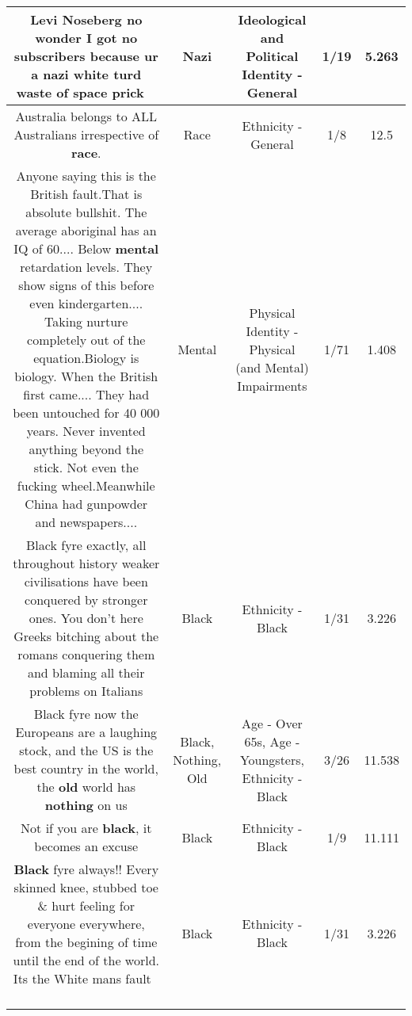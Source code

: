 \documentclass[11pt]{article}
\newlength\mylength
\begin{document}
\begin{center}
\begin{longtable}{|C{.65\mylength}|C{.30\mylength}|C{.12\mylength}|C{.12\mylength}|C{.12\mylength}|}
  \small Levi Noseberg no wonder I got no subscribers because ur a \textbf{nazi} white turd waste of space prick 🖕🏾\normalsize   & Nazi &  Ideological and Political Identity - General & 1/19 & 5.263 \\  \hline
  \small Australia belongs to ALL Australians irrespective of \textbf{race}.\normalsize   & Race & Ethnicity - General & 1/8 & 12.5 \\  \hline
  \small Anyone saying this is the British fault.That is absolute bullshit. The average aboriginal has an IQ of 60.... Below \textbf{mental} retardation levels. They show signs of this before even kindergarten.... Taking nurture completely out of the equation.Biology is biology. When the British first came.... They had been untouched for 40 000 years. Never invented anything beyond the stick. Not even the fucking wheel.Meanwhile China had gunpowder and newspapers....\normalsize   & Mental & Physical Identity - Physical (and Mental) Impairments & 1/71 & 1.408 \\  \hline
  \small Black fyre exactly, all throughout history weaker civilisations have been conquered by stronger ones. You don't here Greeks bitching about the romans conquering them and blaming all their problems on Italians\normalsize   & Black & Ethnicity - Black & 1/31 & 3.226 \\  \hline
  \small Black fyre now the Europeans are a laughing stock, and the US is the best country in the world, the \textbf{old} world has \textbf{nothing} on us\normalsize   & Black, Nothing, Old & Age - Over 65s, Age - Youngsters, Ethnicity - Black & 3/26 & 11.538 \\  \hline
  \small Not if you are \textbf{black},  it becomes an excuse\normalsize   & Black & Ethnicity - Black & 1/9 & 11.111 \\  \hline
  \small \@\textbf{Black} fyre always!! Every skinned knee, stubbed toe \& hurt feeling for everyone everywhere, from the begining of time until the end of the world. Its the White mans fault 🤣😂🤣😂🤣\normalsize   & Black & Ethnicity - Black & 1/31 & 3.226 \\  \hline

\end{longtable}
\end{center}
\end{document}
